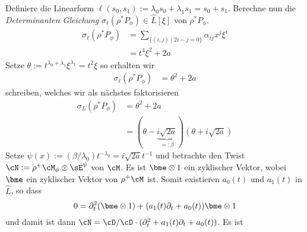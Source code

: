 Definiere die Linearform $\ell(s_0,s_1):=\lambda_0s_0+\lambda_1s_1=s_0+s_1$.
Berechne nun die \emph{Determinanten Gleichung}
$\sigma_\ell(\rho^*P_{\phi})\in \hat L[\xi]$ von $\rho^*P_{\phi}$.
\begin{align*}
\sigma_\ell(\rho^*P_{\phi})
  &= \sum_{\{(i,j)\mid 2i-j=0\}}\alpha_{ij}x^{j}\xi^i\\
  &= t^4\xi^2 + 2a
\end{align*}
Setze $\theta:=t^{\lambda_0+\lambda_1}\xi^{\lambda_1}=t^2\xi$ so erhalten wir
\begin{align*}
\sigma_\ell(\rho^*P_{\phi}) &= \theta^2 + 2a
\end{align*}
schreiben, welches wir als nächstes faktorisieren
\begin{align*}
\sigma_L(\rho^*P_{\phi}) &= \theta^2+2a\\
  &=(\theta-\underset{=:\beta}{\underbrace{i\sqrt{2a}}})
    (\theta+i\sqrt{2a})
\end{align*}
Setze $\psi(x):=(\beta/\lambda_0)t^{-\lambda_0}=i\sqrt{2a}t^{-1}$ und
betrachte den Twist $\cN:=\rho^+\cM_{\phi}\otimes\sE^\psi$ von
$\cM$.
Es ist $\bme\otimes 1$ ein zyklischer Vektor, wobei $\bme$ ein zyklischer
Vektor von $\rho^+\cM$ ist.
Somit existieren $a_0(t)$ und $a_1(t)$ in $\hat L$, so dass
\[
0=\partial_t^2 (\bme\otimes 1) + (a_1(t)\partial_t + a_0(t)) \bme\otimes 1
\]
und damit ist dann $\cN=\cD/\cD\cdot(\partial_t^2+a_1(t)\partial_t+a_0(t))$.
Es ist
